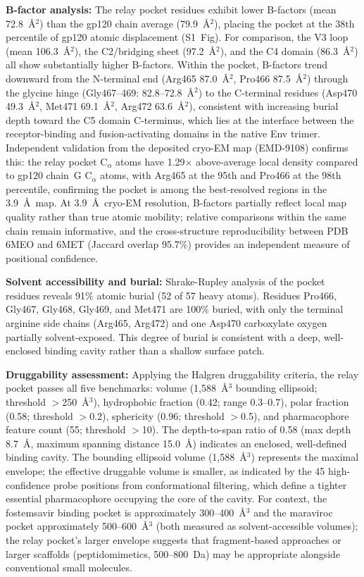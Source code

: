 \documentclass[11pt,a4paper]{article}
\begin{document}
\textbf{B-factor analysis:} The relay pocket residues exhibit lower B-factors (mean 72.8~\AA$^2$) than the gp120 chain average (79.9~\AA$^2$), placing the pocket at the 38th percentile of gp120 atomic displacement (S1~Fig). For comparison, the V3 loop (mean 106.3~\AA$^2$), the C2/bridging sheet (97.2~\AA$^2$), and the C4 domain (86.3~\AA$^2$) all show substantially higher B-factors. Within the pocket, B-factors trend downward from the N-terminal end (Arg465 87.0~\AA$^2$, Pro466 87.5~\AA$^2$) through the glycine hinge (Gly467--469: 82.8--72.8~\AA$^2$) to the C-terminal residues (Asp470 49.3~\AA$^2$, Met471 69.1~\AA$^2$, Arg472 63.6~\AA$^2$), consistent with increasing burial depth toward the C5 domain C-terminus, which lies at the interface between the receptor-binding and fusion-activating domains in the native Env trimer. Independent validation from the deposited cryo-EM map (EMD-9108) confirms this: the relay pocket C$_\alpha$ atoms have 1.29$\times$ above-average local density compared to gp120 chain~G C$_\alpha$ atoms, with Arg465 at the 95th and Pro466 at the 98th percentile, confirming the pocket is among the best-resolved regions in the 3.9~\AA\ map. At 3.9~\AA\ cryo-EM resolution, B-factors partially reflect local map quality rather than true atomic mobility; relative comparisons within the same chain remain informative, and the cross-structure reproducibility between PDB 6MEO and 6MET (Jaccard overlap 95.7\%) provides an independent measure of positional confidence.

\textbf{Solvent accessibility and burial:} Shrake-Rupley analysis of the pocket residues reveals 91\% atomic burial (52 of 57 heavy atoms). Residues Pro466, Gly467, Gly468, Gly469, and Met471 are 100\% buried, with only the terminal arginine side chains (Arg465, Arg472) and one Asp470 carboxylate oxygen partially solvent-exposed. This degree of burial is consistent with a deep, well-enclosed binding cavity rather than a shallow surface patch.

\textbf{Druggability assessment:} Applying the Halgren \citep{Halgren2009} druggability criteria, the relay pocket passes all five benchmarks: volume (1,588~\AA$^3$ bounding ellipsoid; threshold $>$250~\AA$^3$), hydrophobic fraction (0.42; range 0.3--0.7), polar fraction (0.58; threshold $>$0.2), sphericity (0.96; threshold $>$0.5), and pharmacophore feature count (55; threshold $>$10). The depth-to-span ratio of 0.58 (max depth 8.7~\AA, maximum spanning distance 15.0~\AA) indicates an enclosed, well-defined binding cavity. The bounding ellipsoid volume (1,588~\AA$^3$) represents the maximal envelope; the effective druggable volume is smaller, as indicated by the 45 high-confidence probe positions from conformational filtering, which define a tighter essential pharmacophore occupying the core of the cavity. For context, the fostemsavir binding pocket is approximately 300--400~\AA$^3$ and the maraviroc pocket approximately 500--600~\AA$^3$ (both measured as solvent-accessible volumes); the relay pocket's larger envelope suggests that fragment-based approaches or larger scaffolds (peptidomimetics, 500--800~Da) may be appropriate alongside conventional small molecules.
\end{document}
